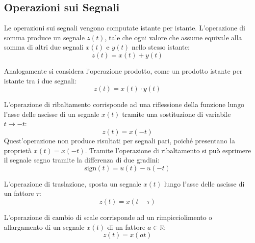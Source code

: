 \documentclass{article}
\numberwithin{equation}{subsection}
\begin{document}
\begin{center}
\end{center}

\subsection{Operazioni sui Segnali}

Le operazioni sui segnali vengono computate istante per istante. L'operazione di somma produce un segnale $z(t)$, tale che ogni valore che assume equivale alla somma 
di altri due segnali $x(t)$ e $y(t)$ nello stesso istante:
\begin{equation*}
    z(t)=x(t)+y(t)
\end{equation*}

Analogamente si considera l'operazione prodotto, come un prodotto istante per istante tra i due segnali:
\begin{equation*}
    z(t)=x(t)\cdot y(t)
\end{equation*}

L'operazione di ribaltamento corrisponde ad una riflessione della funzione lungo l'asse delle ascisse di un segnale $x(t)$ tramite una sostituzione di variabile $t\to-t$:
\begin{equation*}
    z(t)=x(-t)
\end{equation*}
Quest'operazione non produce risultati per segnali pari, poiché presentano la proprietà $x(t)=x(-t)$. 
Tramite l'operazione di ribaltamento si può esprimere il segnale segno tramite la differenza di due gradini:
\begin{equation*}
    \mbox{sign}(t)=u(t)-u(-t)
\end{equation*}


L'operazione di traslazione, sposta un segnale $x(t)$ lungo l'asse delle ascisse di un fattore $\tau$:
\begin{equation*}
    z(t)=x(t-\tau)
\end{equation*}

L'operazione di cambio di scale corrisponde ad un rimpicciolimento o allargamento di un segnale $x(t)$ di un fattore $a\in\mathbb{R}$:
\begin{equation*}
    z(t)=x(at)
\end{equation*}
\end{document}
